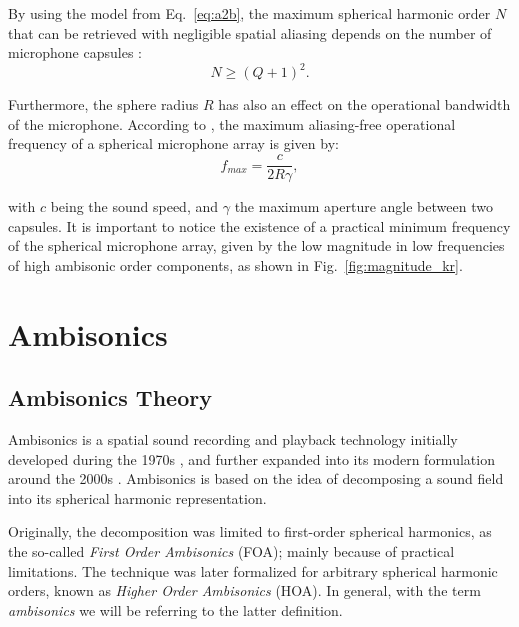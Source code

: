 %

By using the model from Eq.~\ref{eq:a2b}, the maximum spherical harmonic order $N$ that can be retrieved with negligible spatial aliasing depends on the number of microphone capsules \cite{moreau20063d}:
\begin{equation}
	N \geq (Q + 1)^2.
\end{equation}

Furthermore, the sphere radius $R$ has also an effect on the operational bandwidth of the microphone. According to \cite{moreau20063d}, the maximum aliasing-free operational frequency of a spherical microphone array is given by:
\begin{equation}
	f_{max} = \frac{c} {2 R \gamma},
	\label{eq:falias}
\end{equation}

with $c$ being the sound speed, and $\gamma$ the maximum aperture angle between two capsules. 
It is important to notice the existence of a practical minimum frequency of the spherical microphone array, given by the low magnitude in low frequencies of high ambisonic order components, as shown in Fig.~\ref{fig:magnitude_kr}. 



\section{Ambisonics}
\label{sec:ambisonics}

\subsection{Ambisonics Theory}

Ambisonics is a spatial sound recording and playback technology initially developed during the 1970s \cite{gerzon1973periphony}, and further expanded into its modern formulation around the 2000s \cite{daniel2000representation}.  
Ambisonics is based on the idea of decomposing a sound field into its spherical harmonic representation. 

Originally, the decomposition was limited to first-order spherical harmonics, as the so-called \textit{First Order Ambisonics} (FOA); mainly because of practical limitations. 
The technique was later formalized for arbitrary spherical harmonic orders, known as \textit{Higher Order Ambisonics} (HOA).
In general, with the term \textit{ambisonics} we will be referring to the latter definition.\\

